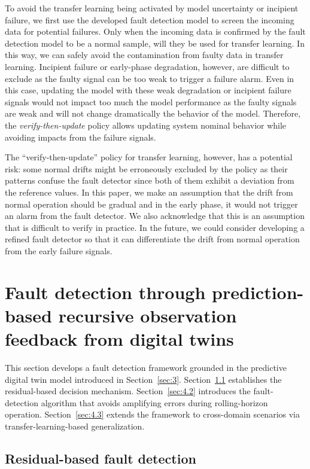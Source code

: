 \documentclass[a4paper,10pt]{cas-sc}%
\newcommand{\rev}[1]{\textcolor{revisionred}{#1}}
\begin{document}
\rev{To avoid the transfer learning being activated by model uncertainty or incipient failure, we first use the developed fault detection model to screen the incoming data for potential failures. Only when the incoming data is confirmed by the fault detection model to be a normal sample, will they be used for transfer learning. In this way, we can safely avoid the contamination from faulty data in transfer learning. Incipient failure or early-phase degradation, however, are difficult to exclude as the faulty signal can be too weak to trigger a failure alarm. Even in this case, updating the model with these weak degradation or incipient failure signals would not impact too much the model performance as the faulty signals are weak and will not change dramatically the behavior of the model. Therefore, the \emph{verify-then-update} policy allows updating system nominal behavior while avoiding impacts from the failure signals.
}

\rev{The ``verify-then-update'' policy for transfer learning, however, has a potential risk: some normal drifts might be erroneously excluded by the policy as their patterns confuse the fault detector since both of them exhibit a deviation from the reference values. In this paper, we make an assumption that the drift from normal operation should be gradual and in the early phase, it would not trigger an alarm from the fault detector. We also acknowledge that this is an assumption that is difficult to verify in practice. In the future, we could consider developing a refined fault detector so that it can differentiate the drift from normal operation from the early failure signals.}

\section{Fault detection through prediction-based recursive observation feedback from digital twins}\label{sec:4}

This section develops a fault detection framework grounded in the predictive digital twin model introduced in Section~\ref{sec:3}.
Section~\ref{sec:4.1} establishes the residual-based decision mechanism.
Section~\ref{sec:4.2} introduces the fault-detection algorithm that avoids amplifying errors during rolling-horizon operation.
Section~\ref{sec:4.3} extends the framework to cross-domain scenarios via transfer-learning-based generalization.

\subsection{Residual-based fault detection}\label{sec:4.1}
\end{document}
